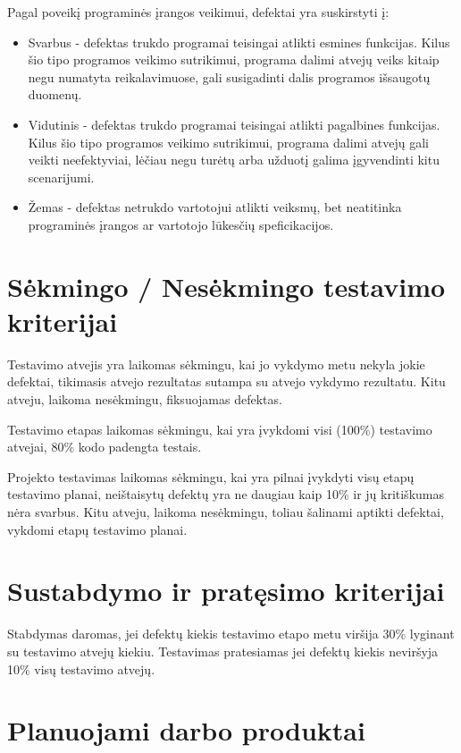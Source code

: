 \documentclass{VUMIFPSkursinis}
\begin{document}
    Pagal poveikį programinės įrangos veikimui, defektai yra suskirstyti į:

    \begin{itemize}
    	\item Svarbus - defektas trukdo programai teisingai atlikti esmines funkcijas. Kilus šio tipo programos
    	veikimo sutrikimui, programa dalimi atvejų veiks kitaip negu numatyta reikalavimuose,
    	gali susigadinti dalis programos išsaugotų duomenų.
    	\item Vidutinis - defektas trukdo programai teisingai atlikti pagalbines funkcijas. Kilus šio tipo
    	programos veikimo sutrikimui, programa dalimi atvejų gali veikti neefektyviai, lėčiau negu turėtų arba užduotį galima įgyvendinti kitu scenarijumi.
      \item Žemas - defektas netrukdo vartotojui atlikti veiksmų, bet neatitinka programinės įrangos ar vartotojo lūkesčių speficikacijos.
    \end{itemize}

    \section{Sėkmingo / Nesėkmingo testavimo kriterijai}

    Testavimo atvejis yra laikomas sėkmingu, kai jo vykdymo metu nekyla jokie defektai, tikimasis atvejo rezultatas sutampa su atvejo vykdymo rezultatu. 
    Kitu atveju, laikoma nesėkmingu, fiksuojamas defektas.

    Testavimo etapas laikomas sėkmingu, kai yra įvykdomi visi (100\%) testavimo atvejai, 80\% kodo padengta testais. 

    Projekto testavimas laikomas sėkmingu, kai yra pilnai įvykdyti visų etapų testavimo planai, neištaisytų defektų yra ne daugiau kaip 10\% ir jų kritiškumas nėra svarbus. 
    Kitu atveju, laikoma nesėkmingu, toliau šalinami aptikti defektai, vykdomi etapų testavimo planai.

    \section{Sustabdymo ir pratęsimo kriterijai}

    Stabdymas daromas, jei defektų kiekis testavimo etapo metu viršija 30\% lyginant su testavimo atvejų kiekiu. 
    Testavimas pratesiamas jei defektų kiekis neviršyja 10\% visų testavimo atvejų.

    \section{Planuojami darbo produktai}
\end{document}
